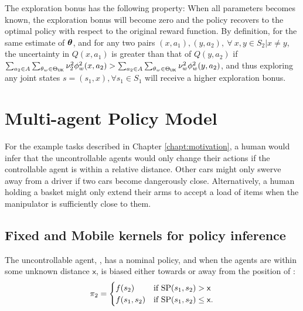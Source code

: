     \par
    The exploration bonus has the following property: When all parameters becomes known, the exploration bonus will
    become zero and the policy recovers to the optimal policy with respect to the original reward function. By
    definition, for the same estimate of  $\boldsymbol{\mathbb{\theta}}$, and for any two pairs $(x,a_1), (y,a_2),\ \forall\ x,y\in S_2 | x
    \neq y$, the uncertainty in $Q(x,a_1)$ is greater than that of $Q(y,a_2)$ if $\sum_{a_2\in A}\sum_{\theta_w\in
    \Theta_{\mathsf{UK}}} \nu_2^2 \phi^2_w(x,a_2) > \sum_{a_2\in A}\sum_{\theta_w\in \Theta_{\mathsf{UK}}}  \nu_w^2
    \phi^2_w(y,a_2)  $, and thus exploring any joint states $s=(s_1,x), \forall s_1 \in S_1$ will receive a higher
    exploration bonus.


\section{Multi-agent Policy Model}

    For the example tasks described in Chapter \ref{chapt:motivation}, a human would infer that the uncontrollable
    agents would only change their actions if the controllable agent is within a relative distance. Other cars might
    only swerve away from a driver if two cars become dangerously close. Alternatively, a human holding a basket might
    only extend their arms to accept a load of items when the manipulator is sufficiently close to them.

\subsection{Fixed and Mobile kernels for policy inference}\label{sec:fixed_and_mobile_kernels}

    \begin{assumption}\label{assump:multi_agent_interraction}
        The uncontrollable agent, , has a nominal policy, and when the agents are within some unknown distance
        $\mathsf{x}$,  is biased either towards or away from the position of :
        \begin{align*}
            \policy{2} & = \begin{cases}
                               f(s_2) & \text{if}\ \textnormal{SP}(s_1,s_2) > \mathsf{x} \\
                               f(s_1,s_2) & \text{if}\ \textnormal{SP}(s_1,s_2) \leq \mathsf{x}.
                           \end{cases} \\
        \end{align*}
    \end{assumption}

